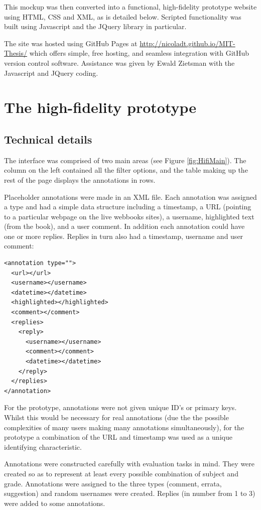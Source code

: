 This mockup was then converted into a functional, high-fidelity prototype website using HTML, CSS and XML, as is detailed below. Scripted functionality was built using Javascript and the JQuery library in particular.  

The site was hosted using GitHub Pages \citep{GitHub} at \href{http://nicoladt.github.io/MIT-Thesis/}{http://nicoladt.github.io/MIT-Thesis/} which offers simple, free hosting, and seamless integration with GitHub version control software. Assistance was given by Ewald Zietsman with the Javascript and JQuery coding. 

\section{The high-fidelity prototype}



\subsection{Technical details}
The interface was comprised of two main areas (see Figure \ref{fig:HifiMain}). The column on the left contained all the filter options, and the table making up the rest of the page displays the annotations in rows.

Placeholder annotations were made in an XML file. Each annotation was assigned a type and had a simple data structure including a timestamp, a URL (pointing to a particular webpage on the live webbooks sites), a username, highlighted text (from the book), and a user comment. In addition each annotation could have one or more replies. Replies in turn also had a timestamp, username and user comment: 
\begin{verbatim}
<annotation type="">
  <url></url>
  <username></username>
  <datetime></datetime>
  <highlighted></highlighted>
  <comment></comment>
  <replies>
    <reply>
      <username></username>
      <comment></comment>
      <datetime></datetime>
    </reply>
  </replies>
</annotation>
\end{verbatim}

For the prototype, annotations were not given unique ID's or primary keys. Whilst this would be necessary for real annotations (due the the possible complexities of many users making many annotations simultaneously), for the prototype a combination of the URL and timestamp was used as a unique identifying characteristic. 

Annotations were constructed carefully with evaluation tasks in mind. They were created so as to represent at least every possible combination of subject and grade. Annotations were assigned to the three types (comment, errata, suggestion) and random usernames were created. Replies (in number from 1 to 3) were added to some annotations.

